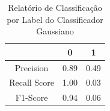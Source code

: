 \documentclass{beamer}
\begin{document}
\begin{frame}
\begin{columns}
\begin{column}{0.5\textwidth}
\begin{table}[H]
\begin{small}
\begin{tabular}{ccc}
                        \hline
                    \end{tabular}
                \end{small}
            
            \end{table}
        \end{column}
        \begin{column}{0.5\textwidth}
            \begin{table}[H]

                \centering
                \caption{\label{tab:cr1-gnb} Relatório de Classificação por Label do Classificador Gaussiano}
                \begin{small}
                    \begin{tabular}{ccc}
                    
                        \hline
                                                & 0                & 1\\
                        \hline
                        Precision                & 0.89             & 0.49\\
                        Recall Score            & 1.00             & 0.03\\
                        F1-Score                & 0.94             & 0.06\\
                        
                        \hline
                    \end{tabular}
                \end{small}
            
            \end{table}
        \end{column}
        \end{columns}    
\end{frame}
\end{document}
